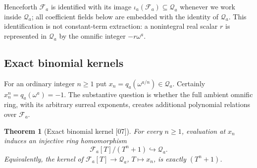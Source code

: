 \documentclass[11pt,letterpaper]{article}
\numberwithin{equation}{section}
\newtheorem{theorem}{Theorem}[section]
\theoremstyle{definition}
\theoremstyle{remark}
\theoremstyle{plain}
\newcommand{\FF}{\mathscr F}         %
\newcommand{\Qa}{\mathcal Q}         %
\newcommand{\src}[1]{\textup{\textsf{[#1]}}}
\begin{document}
Henceforth $\FF_a$ is identified with its image $\iota_a(\FF_a)\subseteq\Qa_a$ whenever we
work inside $\Qa_a$; all coefficient fields below are embedded with the identity of
$\Qa_a$. This identification is not constant-term extraction: a nonintegral real scalar
$r$ is represented in $\Qa_a$ by the omnific integer $-r\omega^a$.

\subsection{Exact binomial kernels}\label{osq:if:sub:kernel}

For an ordinary integer $n\ge1$ put $x_n=q_a(\omega^{a/n})\in\Qa_a$. Certainly
$x_n^n=q_a(\omega^a)=-1$. The substantive question is whether the full ambient omnific
ring, with its arbitrary surreal exponents, creates additional polynomial relations over
$\FF_a$.

\begin{theorem}[Exact binomial kernel \src{07}]\label{osq:if:thm:binomialkernel}
For every $n\ge1$, evaluation at $x_n$ induces an injective ring homomorphism
\begin{equation}\label{osq:if:eq:binomialinjection}
 \FF_a[T]/(T^n+1)\hookrightarrow\Qa_a .
\end{equation}
Equivalently, the kernel of $\FF_a[T]\to\Qa_a$, $T\mapsto x_n$, is exactly $(T^n+1)$.
\end{theorem}
\end{document}
